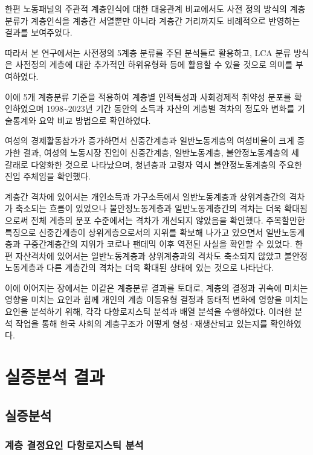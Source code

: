 \documentclass[
  letterpaper,
  DIV=11,
  numbers=noendperiod]{scrartcl}
\begin{document}
한편 노동패널의 주관적 계층인식에 대한 대응관계 비교에서도 사전 정의
방식의 계층분류가 계층인식을 계층간 서열뿐만 아니라 계층간 거리까지도
비례적으로 반영하는 결과를 보여주었다.

따라서 본 연구에서는 사전정의 5계층 분류를 주된 분석틀로 활용하고, LCA
분류 방식은 사전정의 계층에 대한 추가적인 하위유형화 등에 활용할 수 있을
것으로 의미를 부여하였다.

이에 5개 계층분류 기준을 적용하여 계층별 인적특성과 사회경제적 취약성
분포를 확인하였으며 1998\textasciitilde2023년 기간 동안의 소득과 자산의
계층별 격차의 정도와 변화를 기술통계와 요약 비교 방법으로 확인하였다.

여성의 경제활동참가가 증가하면서 신중간계층과 일반노동계층의 여성비율이
크게 증가한 결과, 여성의 노동시장 진입이 신중간계층, 일반노동계층,
불안정노동계층의 세 갈래로 다양화한 것으로 나타났으며, 청년층과 고령자
역시 불안정노동계층의 주요한 진입 주체임을 확인했다.

계층간 격차에 있어서는 개인소득과 가구소득에서 일반노동계층과
상위계층간의 격차가 축소되는 흐름이 있었으나 불안정노동계층과
일반노동계층간의 격차는 더욱 확대됨으로써 전체 계층의 분포 수준에서는
격차가 개선되지 않았음을 확인했다. 주목할만한 특징으로 신중간계층이
상위계층으로서의 지위를 확보해 나가고 있으면서 일반노동계층과
구중간계층간의 지위가 코로나 팬데믹 이후 역전된 사실을 확인할 수 있었다.
한편 자산격차에 있어서는 일반노동계층과 상위계층과의 격차도 축소되지
않았고 불안정노동계층과 다른 계층간의 격차는 더욱 확대된 상태에 있는
것으로 나타난다.

이에 이어지는 장에서는 이같은 계층분류 결과를 토대로, 계층의 결정과
귀속에 미치는 영향을 미치는 요인과 힘께 개인의 계층 이동유형 결정과
동태적 변화에 영향을 미치는 요인을 분석하기 위해, 각각 다항로지스틱
분석과 배열 분석을 수행하였다. 이러한 분석 작업을 통해 한국 사회의
계층구조가 어떻게 형성·재생산되고 있는지를 확인하였다.

\newpage{}

\section{실증분석 결과}\label{uxc2e4uxc99duxbd84uxc11d-uxacb0uxacfc}

\subsection{실증분석}\label{uxc2e4uxc99duxbd84uxc11d}

\subsubsection{계층 결정요인 다항로지스틱
분석}\label{uxacc4uxce35-uxacb0uxc815uxc694uxc778-uxb2e4uxd56duxb85cuxc9c0uxc2a4uxd2f1-uxbd84uxc11d}
\end{document}
